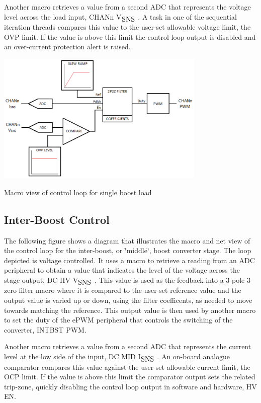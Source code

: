 Another macro retrieves a value from a second A\-D\-C that represents the voltage level across the load input, C\-H\-A\-Nn V$_{\mbox{S\-N\-S}}$ . A task in one of the sequential iteration threads compares this value to the user-\/set allowable voltage limit, the O\-V\-P limit. If the value is above this limit the control loop output is disabled and an over-\/current protection alert is raised.


\begin{DoxyImage}
\includegraphics[width=10cm]{boost_load_loop}
\caption{Macro view of control loop for single boost load}
\end{DoxyImage}
\hypertarget{index_ibctrl}{}\subsection{Inter-\/\-Boost Control}\label{index_ibctrl}
The following figure shows a diagram that illustrates the macro and net view of the control loop for the inter-\/boost, or \char`\"{}middle\char`\"{}, boost converter stage. The loop depicted is voltage controlled. It uses a macro to retrieve a reading from an A\-D\-C peripheral to obtain a value that indicates the level of the voltage across the stage output, D\-C H\-V V$_{\mbox{S\-N\-S}}$ . This value is used as the feedback into a 3-\/pole 3-\/zero filter macro where it is compared to the user-\/set reference value and the output value is varied up or down, using the filter coefficents, as needed to move towards matching the reference. This output value is then used by another macro to set the duty of the e\-P\-W\-M peripheral that controls the switching of the converter, I\-N\-T\-B\-S\-T P\-W\-M.

Another macro retrieves a value from a second A\-D\-C that represents the current level at the low side of the input, D\-C M\-I\-D I$_{\mbox{S\-N\-S}}$ . An on-\/board analogue comparator compares this value against the user-\/set allowable current limit, the O\-C\-P limit. If the value is above this limit the comparator output sets the related trip-\/zone, quickly disabling the control loop output in software and hardware, H\-V E\-N.


